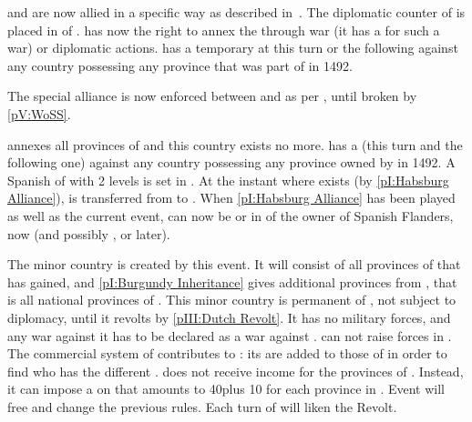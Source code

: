 


\phevnt
\aparag \SPA and \HAB are now allied in a specific way as described
in~.  The diplomatic counter of
\HAB is placed in \EG of \SPA.
\aparag \SPA has now the right to annex the \paysprovincesne through war (it
has a \CB for such a war) or diplomatic actions.
\aparag \SPA has a temporary \CB at this turn or the following against any
country possessing any province that was part of \paysBourgogne in 1492.

\effetlong
{} The special alliance is now enforced between \SPA and
\HAB as per , until broken by
\ref{pV:WoSS}.






\phevnt
\aparag \SPA annexes all provinces of \paysBourgogne and this country exists
no more.  \SPA has a \CB (this turn and the following one) against any country
possessing any province owned by \paysBourgogne in 1492.
\aparag A Spanish \MNU of  with 2 levels is set in
\provinceVlaandern.
\aparag At the instant where \paysHollande exists (by \ref{pI:Habsburg
  Alliance}), \provinceZeeland is transferred from \SPA to \paysHollande.
When \ref{pI:Habsburg Alliance} has been played as well as the current event,
\paysLiege can now be \VASSAL or in \ANNEXION of the owner of Spanish
Flanders, \SPA now (and possibly \FRA, \ENG or \AUS later).

\effetlong
{}
\bparag The minor country \paysHollande is created by this event.  It will
consist of all provinces of \paysprovincesne that \SPA has gained, and
\ref{pI:Burgundy Inheritance} gives additional provinces from \paysBourgogne,
that is all national provinces of \paysHollande. This minor country is
permanent \VASSAL of \SPA, not subject to diplomacy, until it revolts by
\ref{pIII:Dutch Revolt}. It has no military forces, and any war against it has
to be declared as a war against \SPA. \SPA can not raise forces in
\paysHollande.
\bparag The commercial system of \paysHollande contributes to \SPA: its
\TradeFLEET are added to those of \SPA in order to find who has the different
\CC.
\bparag \SPA does not receive income for the provinces of \paysHollande.
Instead, it can impose a  on \paysHollande that amounts to
40\ducats plus 10 \ducats for each province in \paysHollande.
\bparag Event  will free \paysHollande and change the
previous rules. Each turn of  will liken the Revolt.



